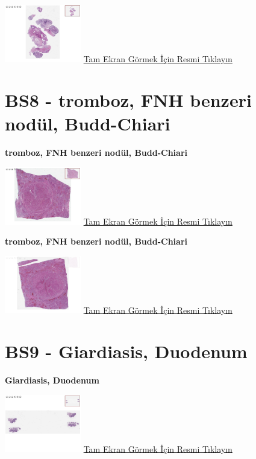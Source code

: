 \documentclass[
  letterpaper,
  DIV=11,
  numbers=noendperiod]{scrreprt}
\begin{document}
\href{https://images.patolojiatlasi.com/BS7/HE.html}{\includegraphics[width=0.25\textwidth,height=\textheight]{./screenshots/thumbnail_BS7-HE.png}}
\href{https://images.patolojiatlasi.com/BS7/HE.html}{Tam Ekran Görmek
İçin Resmi Tıklayın}

\hypertarget{sec-BS8}{%
\section{BS8 - tromboz, FNH benzeri nodül, Budd-Chiari}\label{sec-BS8}}

\textbf{tromboz, FNH benzeri nodül, Budd-Chiari}

\href{https://images.patolojiatlasi.com/BS8/HE1.html}{\includegraphics[width=0.25\textwidth,height=\textheight]{./screenshots/thumbnail_BS8-HE1.png}}
\href{https://images.patolojiatlasi.com/BS8/HE1.html}{Tam Ekran Görmek
İçin Resmi Tıklayın}

\textbf{tromboz, FNH benzeri nodül, Budd-Chiari}

\href{https://images.patolojiatlasi.com/BS8/HE2.html}{\includegraphics[width=0.25\textwidth,height=\textheight]{./screenshots/thumbnail_BS8-HE2.png}}
\href{https://images.patolojiatlasi.com/BS8/HE2.html}{Tam Ekran Görmek
İçin Resmi Tıklayın}

\hypertarget{sec-BS9}{%
\section{BS9 - Giardiasis, Duodenum}\label{sec-BS9}}

\textbf{Giardiasis, Duodenum}

\href{https://images.patolojiatlasi.com/BS9/HE1.html}{\includegraphics[width=0.25\textwidth,height=\textheight]{./screenshots/thumbnail_BS9-HE1.png}}
\href{https://images.patolojiatlasi.com/BS9/HE1.html}{Tam Ekran Görmek
İçin Resmi Tıklayın}
\end{document}
